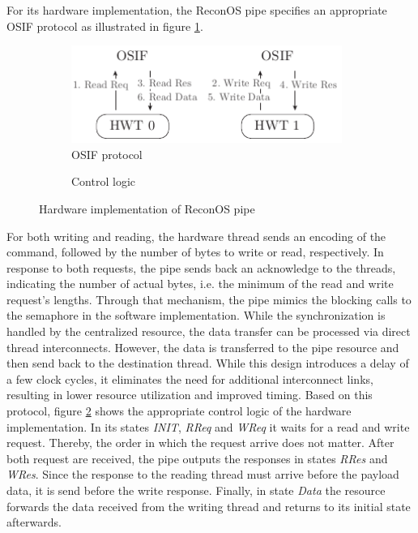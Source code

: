 For its hardware implementation, the ReconOS pipe specifies an appropriate
\ac{OSIF} protocol as illustrated in figure \ref{fig:pipe_hw_osif}.
\begin{figure}
	\centering
	\begin{subfigure}{0.49\textwidth}
		\centering
		\includegraphics[width=0.97\textwidth]{../figures/pipe_osif}
		\caption{\acs{OSIF} protocol}
		\label{fig:pipe_hw_osif}
	\end{subfigure}
	\begin{subfigure}{0.49\textwidth}
		\centering
		\caption{Control logic}
		\label{fig:pipe_hw_fsm}
	\end{subfigure}
	\caption{Hardware implementation of ReconOS pipe}
	\label{fig:pipe_hw}
\end{figure}
For both writing and reading, the hardware thread sends an encoding of the
command, followed by the number of bytes to write or read, respectively. In
response to both requests, the pipe sends back an acknowledge to the threads,
indicating the number of actual bytes, i.e. the minimum of the read and write
request's lengths. Through that mechanism, the pipe mimics the blocking calls
to the semaphore in the software implementation. While the synchronization is
handled by the centralized resource, the data transfer can be processed via
direct thread interconnects. However, the data is transferred to the pipe
resource and then send back to the destination thread. While this design
introduces a delay of a few clock cycles, it eliminates the need for
additional interconnect links, resulting in lower resource utilization and
improved timing. Based on this protocol, figure \ref{fig:pipe_hw_fsm} shows
the appropriate control logic of the hardware implementation. In its states
\emph{INIT}, \emph{RReq} and \emph{WReq} it waits for a read and write
request. Thereby, the order in which the request arrive does not matter. After
both request are received, the pipe outputs the responses in states
\emph{RRes} and \emph{WRes}. Since the response to the reading thread must
arrive before the payload data, it is send before the write response. Finally,
in state \emph{Data} the resource forwards the data received from the writing
thread and returns to its initial state afterwards.

